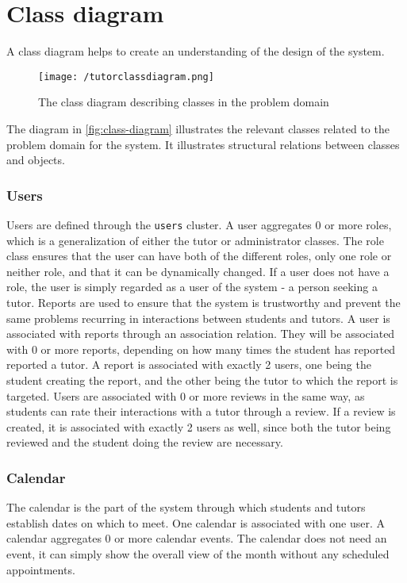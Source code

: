 \section{Class diagram}
A class diagram helps to create an understanding of the design of the system.
\begin{figure}[]
    \texttt{[image: /tutorclassdiagram.png]}
     \caption{The class diagram describing classes in the problem domain}
     \label{fig:class-diagram}
 \end{figure}
The diagram in \autoref{fig:class-diagram} illustrates the relevant classes related to the problem domain for the system.
It illustrates structural relations between classes and objects\cite{OOAD}.

\subsubsection{Users}
Users are defined through the \texttt{users} cluster.
A user aggregates 0 or more roles, which is a generalization of either the tutor or administrator classes.
The role class ensures that the user can have both of the different roles, only one role or neither role, and that it can be dynamically changed.
If a user does not have a role, the user is simply regarded as a user of the system - a person seeking a tutor.
Reports are used to ensure that the system is trustworthy and prevent the same problems recurring in interactions between students and tutors.
A user is associated with reports through an association relation.
They will be associated with 0 or more reports, depending on how many times the student has reported reported a tutor.
A report is associated with exactly 2 users, one being the student creating the report, and the other being the tutor to which the report is targeted.
Users are associated with 0 or more reviews in the same way, as students can rate their interactions with a tutor through a review.
If a review is created, it is associated with exactly 2 users as well, since both the tutor being reviewed and the student doing the review are necessary.

\subsubsection{Calendar}
The calendar is the part of the system through which students and tutors establish dates on which to meet.
One calendar is associated with one user.
A calendar aggregates 0 or more calendar events.
The calendar does not need an event, it can simply show the overall view of the month without any scheduled appointments.

